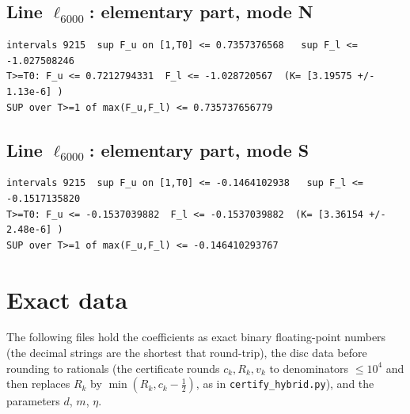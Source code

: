 \documentclass[11pt,reqno]{amsart}
\numberwithin{equation}{section}
\theoremstyle{definition}
\theoremstyle{remark}
\begin{document}
\subsection*{Line $\ell_{6000}$: elementary part, mode N}
\begin{lstlisting}
intervals 9215  sup F_u on [1,T0] <= 0.7357376568   sup F_l <= -1.027508246
T>=T0: F_u <= 0.7212794331  F_l <= -1.028720567  (K= [3.19575 +/- 1.13e-6] )
SUP over T>=1 of max(F_u,F_l) <= 0.735737656779
\end{lstlisting}
\subsection*{Line $\ell_{6000}$: elementary part, mode S}
\begin{lstlisting}
intervals 9215  sup F_u on [1,T0] <= -0.1464102938   sup F_l <= -0.1517135820
T>=T0: F_u <= -0.1537039882  F_l <= -0.1537039882  (K= [3.36154 +/- 2.48e-6] )
SUP over T>=1 of max(F_u,F_l) <= -0.146410293767
\end{lstlisting}
\section{Exact data}\label{app:data}
The following files hold the coefficients as exact binary floating-point numbers (the decimal strings are the shortest that round-trip), the disc data before rounding to rationals (the certificate rounds $c_k,R_k,v_k$ to denominators $\le10^4$ and then replaces $R_k$ by $\min(R_k,c_k-\frac12)$, as in \texttt{certify\_hybrid.py}), and the parameters $d$, $m$, $\eta$.
\end{document}
